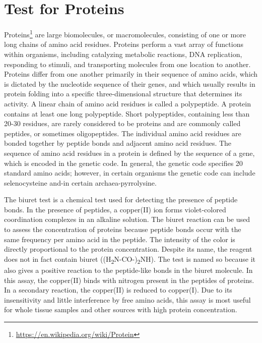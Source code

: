 \documentclass[]{book}
\let\rmarkdownfootnote\footnote%
\def\footnote{\protect\rmarkdownfootnote}
\renewcommand{\href}[2]{#2\footnote{\url{#1}}}
\theoremstyle{definition}
\theoremstyle{definition}
\theoremstyle{definition}
\theoremstyle{remark}
\begin{document}
\section{Test for Proteins}\label{test-for-proteins}

\href{https://en.wikipedia.org/wiki/Protein}{Proteins} are large
biomolecules, or macromolecules, consisting of one or more long chains
of amino acid residues. Proteins perform a vast array of functions
within organisms, including catalyzing metabolic reactions, DNA
replication, responding to stimuli, and transporting molecules from one
location to another. Proteins differ from one another primarily in their
sequence of amino acids, which is dictated by the nucleotide sequence of
their genes, and which usually results in protein folding into a
specific three-dimensional structure that determines its activity. A
linear chain of amino acid residues is called a polypeptide. A protein
contains at least one long polypeptide. Short polypeptides, containing
less than 20-30 residues, are rarely considered to be proteins and are
commonly called peptides, or sometimes oligopeptides. The individual
amino acid residues are bonded together by peptide bonds and adjacent
amino acid residues. The sequence of amino acid residues in a protein is
defined by the sequence of a gene, which is encoded in the genetic code.
In general, the genetic code specifies 20 standard amino acids; however,
in certain organisms the genetic code can include selenocysteine and-in
certain archaea-pyrrolysine.

The biuret test is a chemical test used for detecting the presence of
peptide bonds. In the presence of peptides, a copper(II) ion forms
violet-colored coordination complexes in an alkaline solution. The
biuret reaction can be used to assess the concentration of proteins
because peptide bonds occur with the same frequency per amino acid in
the peptide. The intensity of the color is directly proportional to the
protein concentration. Despite its name, the reagent does not in fact
contain biuret ((H\textsubscript{2}N-CO-)\textsubscript{2}NH). The test
is named so because it also gives a positive reaction to the
peptide-like bonds in the biuret molecule. In this assay, the copper(II)
binds with nitrogen present in the peptides of proteins. In a secondary
reaction, the copper(II) is reduced to copper(I). Due to its
insensitivity and little interference by free amino acids, this assay is
most useful for whole tissue samples and other sources with high protein
concentration.
\end{document}
